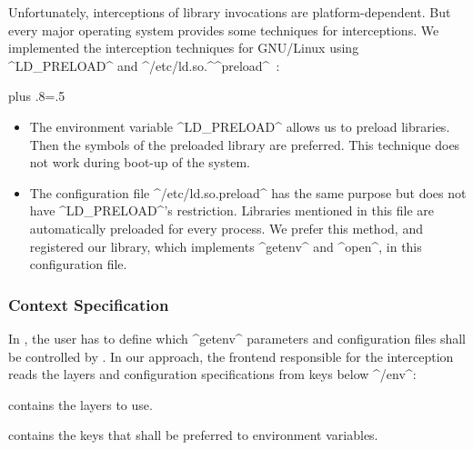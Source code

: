 Unfortunately, interceptions of library invocations are platform-dependent.
But every major operating system provides some techniques for interceptions.
We implemented the interception techniques for GNU/Linux using ^LD_PRELOAD^ and ^/etc/ld.so.^\linebreak^preload^~\cite{raab2017introducing}:%
{\parfillskip=0pt plus .8\textwidth \emergencystretch=.5\textwidth \par}
\begin{itemize}
\item
The environment variable ^LD_PRELOAD^ allows us to preload libraries.
Then the symbols of the preloaded library are preferred.
This technique does not work during boot-up of the system.
\item
The configuration file ^/etc/ld.so.preload^ has the same purpose but does not have ^LD_PRELOAD^'s restriction.
Libraries mentioned in this file are automatically preloaded for every process.
We prefer this method, and registered our library, which implements ^getenv^ and ^open^, in this configuration file.
\end{itemize}



\subsubsection{Context Specification}

In , the user has to define which ^getenv^ parameters and configuration files shall be controlled by \elektra{}.
In our approach, the frontend responsible for the interception reads the layers and configuration specifications from keys below ^/env^:
\begin{description}[font=\texttt]
\item[/env/layer] contains the layers to use.
\item[/env/override] contains the keys that shall be preferred to environment variables.
\end{description}



